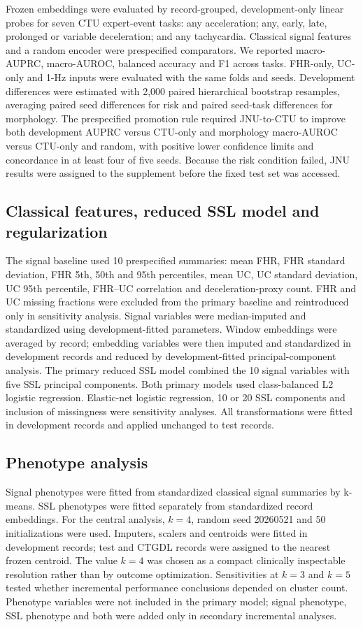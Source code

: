\documentclass[utf8]{FrontiersinHarvard}
\begin{document}
Frozen embeddings were evaluated by record-grouped, development-only linear probes for seven CTU expert-event tasks: any acceleration; any, early, late, prolonged or variable deceleration; and any tachycardia. Classical signal features and a random encoder were prespecified comparators. We reported macro-AUPRC, macro-AUROC, balanced accuracy and F1 across tasks. FHR-only, UC-only and 1-Hz inputs were evaluated with the same folds and seeds. Development differences were estimated with 2,000 paired hierarchical bootstrap resamples, averaging paired seed differences for risk and paired seed-task differences for morphology. The prespecified promotion rule required JNU-to-CTU to improve both development AUPRC versus CTU-only and morphology macro-AUROC versus CTU-only and random, with positive lower confidence limits and concordance in at least four of five seeds. Because the risk condition failed, JNU results were assigned to the supplement before the fixed test set was accessed.

\subsection{Classical features, reduced SSL model and regularization}

The signal baseline used 10 prespecified summaries: mean FHR, FHR standard deviation, FHR 5th, 50th and 95th percentiles, mean UC, UC standard deviation, UC 95th percentile, FHR--UC correlation and deceleration-proxy count. FHR and UC missing fractions were excluded from the primary baseline and reintroduced only in sensitivity analysis. Signal variables were median-imputed and standardized using development-fitted parameters. Window embeddings were averaged by record; embedding variables were then imputed and standardized in development records and reduced by development-fitted principal-component analysis. The primary reduced SSL model combined the 10 signal variables with five SSL principal components. Both primary models used class-balanced L2 logistic regression. Elastic-net logistic regression, 10 or 20 SSL components and inclusion of missingness were sensitivity analyses. All transformations were fitted in development records and applied unchanged to test records.

\subsection{Phenotype analysis}

Signal phenotypes were fitted from standardized classical signal summaries by k-means. SSL phenotypes were fitted separately from standardized record embeddings. For the central analysis, $k=4$, random seed 20260521 and 50 initializations were used. Imputers, scalers and centroids were fitted in development records; test and CTGDL records were assigned to the nearest frozen centroid. The value $k=4$ was chosen as a compact clinically inspectable resolution rather than by outcome optimization. Sensitivities at $k=3$ and $k=5$ tested whether incremental performance conclusions depended on cluster count. Phenotype variables were not included in the primary model; signal phenotype, SSL phenotype and both were added only in secondary incremental analyses.
\end{document}
